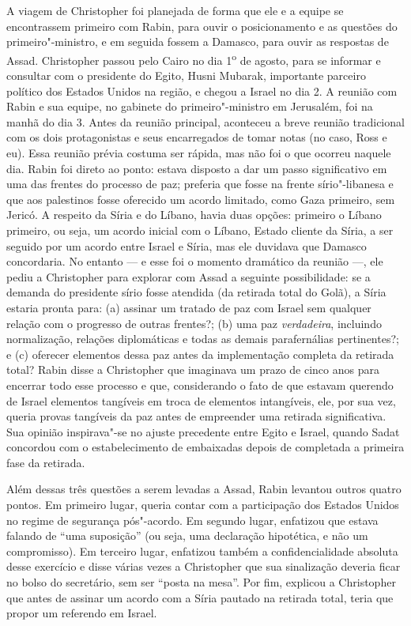 A viagem de Christopher foi planejada de forma que ele e a equipe se
encontrassem primeiro com Rabin, para ouvir o posicionamento e as
questões do primeiro"-ministro, e em seguida fossem a Damasco, para ouvir
as respostas de Assad. Christopher passou pelo Cairo no dia 1\textsuperscript{o} de
agosto, para se informar e consultar com o presidente do Egito, Husni
Mubarak, importante parceiro político dos Estados Unidos na região, e
chegou a Israel no dia 2. A reunião com Rabin e sua equipe, no gabinete
do primeiro"-ministro em Jerusalém, foi na manhã do dia 3. Antes da
reunião principal, aconteceu a breve reunião tradicional com os dois
protagonistas e seus encarregados de tomar notas (no caso, Ross e eu).
Essa reunião prévia costuma ser rápida, mas não foi o que ocorreu
naquele dia. Rabin foi direto ao ponto: estava disposto a dar um passo
significativo em uma das frentes do processo de paz; preferia que fosse
na frente sírio"-libanesa e que aos palestinos fosse oferecido um acordo
limitado, como Gaza primeiro, sem Jericó. A respeito da Síria e do
Líbano, havia duas opções: primeiro o Líbano primeiro, ou seja, um
acordo inicial com o Líbano, Estado cliente da Síria, a ser seguido por
um acordo entre Israel e Síria, mas ele duvidava que Damasco
concordaria. No entanto --- e esse foi o momento dramático da reunião ---,
ele pediu a Christopher para explorar com Assad a seguinte possibilidade:
se a demanda do presidente sírio fosse atendida (da retirada total do
Golã), a Síria estaria pronta para: (a) assinar um tratado de paz com
Israel sem qualquer relação com o progresso de outras frentes?; (b) uma
paz \emph{verdadeira}, incluindo normalização, relações diplomáticas e
todas as demais parafernálias pertinentes?; e (c) oferecer elementos
dessa paz antes da implementação completa da retirada total? Rabin disse
a Christopher que imaginava um prazo de cinco anos para encerrar todo
esse processo e que, considerando o fato de que estavam querendo de
Israel elementos tangíveis em troca de elementos intangíveis, ele, por
sua vez, queria provas tangíveis da paz antes de empreender uma retirada
significativa. Sua opinião inspirava"-se no ajuste precedente entre Egito
e Israel, quando Sadat concordou com o estabelecimento de embaixadas
depois de completada a primeira fase da retirada.

Além dessas três questões a serem levadas a Assad, Rabin levantou outros
quatro pontos. Em primeiro lugar, queria contar com a participação dos
Estados Unidos no regime de segurança pós"-acordo. Em segundo lugar,
enfatizou que estava falando de ``uma suposição'' (ou seja, uma
declaração hipotética, e não um compromisso). Em terceiro lugar,
enfatizou também a confidencialidade absoluta desse exercício e disse
várias vezes a Christopher que sua sinalização deveria ficar no bolso do
secretário, sem ser ``posta na mesa''. Por fim, explicou a Christopher
que antes de assinar um acordo com a Síria pautado na retirada total,
teria que propor um referendo em Israel.

